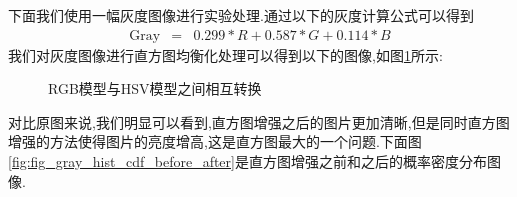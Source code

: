 \documentclass[UTF8,a4paper,10pt]{ctexart}
\begin{document}
\begin{flushleft}
        \hspace{2em}下面我们使用一幅灰度图像进行实验处理.通过以下的灰度计算公式可以得到
        \begin{eqnarray}
            \text{Gray}&=&0.299*R+0.587*G+0.114*B\nonumber
        \end{eqnarray}
        我们对灰度图像进行直方图均衡化处理可以得到以下的图像,如图\ref{fig:fig_gray_hist_imporve_model}所示:\\
        \begin{figure}[htbp]
            \centering
            \caption{RGB模型与HSV模型之间相互转换}
            \label{fig:fig_gray_hist_imporve_model}
        \end{figure}
        \newpage
        \hspace{2em}对比原图来说,我们明显可以看到,直方图增强之后的图片更加清晰,但是同时直方图增强的方法使得图片的亮度增高,这是直方图最大的一个问题.下面图\ref{fig:fig_gray_hist_cdf_before_after}是直方图增强之前和之后的概率密度分布图像.\\
        \begin{figure}[htbp]
            \centering
            \subfigure[原始累计函数分布]{
}
\end{figure}
\end{flushleft}
\end{document}
